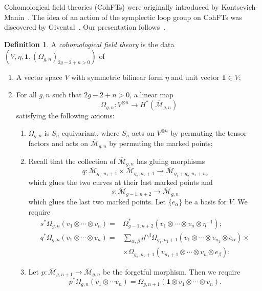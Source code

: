 \documentclass[10pt]{amsart}
\theoremstyle{definition}
\newtheorem{defn}[thm]{Definition}
\theoremstyle{remark}
\theoremstyle{plain}
\theoremstyle{definition}
\theoremstyle{remark}
\newcommand{\msc}[1]{\mathscr{#1}}
\newcommand{\mbf}[1]{\mathbf{#1}}
\newcommand{\ol}[1]{\overline{#1}}
\newcommand{\1}{\mathbf{1}}
\newcommand{\2}{\mathbf{2}}
\newcommand{\3}{\mathbf{3}}
\numberwithin{equation}{section}
\begin{document}
Cohomological field theories (CohFTs) were originally introduced by Kontsevich-Manin~\cite{km94}. The idea of an action of the symplectic loop group on CohFTs was discovered by Givental~\cite{virasorofanotoric}. Our presentation follows~\cite{relationsvia3spin}.
\begin{defn}
    A \textit{cohomological field theory} is the data $(V, \eta, \mbf{1}, (\Omega_{g,n})_{2g-2+n>0})$ of
    \begin{enumerate}
        \item A vector space $V$ with symmetric bilinear form $\eta$ and unit vector $\mbf{1} \in V$;
        \item For all $g,n$ such that $2g-2+n > 0$, a linear map
            \[ \Omega_{g,n} \colon V^{\otimes n} \to H^*(\ol{\msc{M}}_{g,n}) \]
            satisfying the following axioms:
            \begin{enumerate}
                \item $\Omega_{g,n}$ is $S_n$-equivariant, where $S_n$ acts on $V^{\otimes n}$ by permuting the tensor factors and acts on $\ol{\msc{M}}_{g,n}$ by permuting the marked points;
                \item Recall that the collection of $\ol{\msc{M}}_{g,n}$ has gluing morphisms
                    \[ q \colon \ol{\msc{M}}_{g_1, n_1+1} \times \ol{\msc{M}}_{g_2, n_2+1} \to \ol{\msc{M}}_{g_1+g_2, n_1+n_2} \]
                    which glues the two curves at their last marked points and
                    \[ s \colon \ol{\msc{M}}_{g-1, n+2} \to \ol{\msc{M}}_{g, n} \]
                    which glues the last two marked points. Let $\{e_{\alpha}\}$ be a basis for $V$. We require
                    \begin{align*}
                        s^*\Omega_{g,n}(v_1\otimes \cdots \otimes v_n) ={}& \Omega^*_{g-1, n+2}(v_1 \otimes \cdots \otimes v_n \otimes \eta^{-1}); \\
                        q^* \Omega_{g,n}(v_1 \otimes \cdots \otimes v_n) ={}& \sum_{\alpha, \beta} \eta^{\alpha\beta} \Omega_{g_1, n_1+1}(v_1 \otimes \cdots \otimes v_{n_1} \otimes e_{\alpha}) \times \\ &\times \Omega_{g_2, n_2+1}(v_{n_1+1} \otimes \cdots \otimes v_{n} \otimes e_{\beta});
                    \end{align*}
                \item Let $p \colon \ol{\msc{M}}_{g,n+1} \to \ol{\msc{M}}_{g,n}$ be the forgetful morphism. Then we require
                    \[ p^* \Omega_{g,n}(v_1 \otimes \cdots v_n) = \Omega_{g,n+1}(\mbf{1} \otimes v_1 \otimes \cdots \otimes v_n). \]
            \end{enumerate}
    \end{enumerate}
\end{defn}
\end{document}
